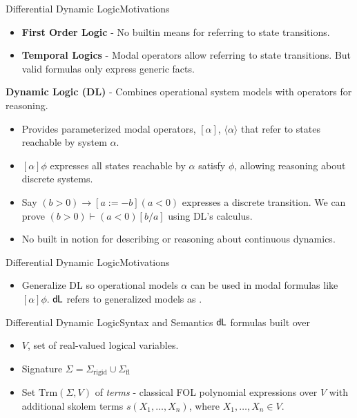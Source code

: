 \documentclass{beamer}
\newcommand{\dL}{\text{\upshape\textsf{d{\kern-0.05em}L}}}
\begin{document}
\begin{frame}{Differential Dynamic Logic}{Motivations}
  \begin{itemize}
    \item \textbf{First Order Logic} - No builtin means for referring to state
      transitions.
    \item \textbf{Temporal Logics} - Modal operators allow referring to state transitions.
      But valid formulas only express generic facts.
      \end{itemize}
\end{frame}
\begin{frame}
    \textbf{Dynamic Logic (DL)} - Combines operational system models with
      operators for reasoning.
      \begin{itemize}
        \item Provides parameterized modal operators, $[\alpha]$,
          $\langle\alpha\rangle$
          that refer to states reachable by system $\alpha$.
        \item $[\alpha]\phi$ expresses all states reachable by $\alpha$ satisfy
          $\phi$, allowing reasoning about discrete systems.
        \item Say $(b > 0) \to [a := -b] (a < 0) $ expresses a
          discrete transition. We can prove $(b > 0) \vdash (a < 0) [ b / a ]$
          using DL's calculus.
        \item No built in notion for describing or reasoning about continuous dynamics.
      \end{itemize}
\end{frame}

\begin{frame}{Differential Dynamic Logic}{Motivations}
  \begin{itemize}
    \item Generalize DL so operational models $\alpha$ can be
      used in modal formulas like $[\alpha]\phi$. $\dL$ refers to
      generalized models as .
  \end{itemize}
\end{frame}

\begin{frame}{Differential Dynamic Logic}{Syntax and Semantics}
    $\dL$ formulas built over
    \begin{itemize}
      \item $V$, set of real-valued logical variables.
      \item Signature $\Sigma = \Sigma_{\text{rigid}} \cup \Sigma_{\text{fl}}$
      \item Set $\text{Trm}(\Sigma,V)$ of \textit{terms} - classical FOL polynomial
        expressions over $V$ with additional skolem terms $s(X_1, \dots,
   X_n)$, where $X_1, \dots, X_n \in V$.
 \end{itemize}
\end{frame}
\end{document}
